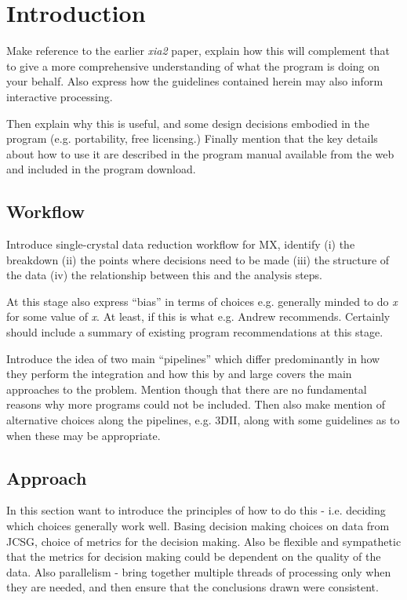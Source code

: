 \documentclass[a4paper,11pt]{article}
\begin{document}
\section{Introduction}

Make reference to the earlier \emph{xia2} paper, explain how this will
complement that to give a more comprehensive understanding of what the
program is doing on your behalf. Also express how the guidelines
contained herein may also inform interactive processing.

Then explain why this is useful, and some design decisions embodied in
the program (e.g. portability, free licensing.) Finally mention that
the key details about how to use it are described in the program
manual available from the web and included in the program download.

\subsection{Workflow}

Introduce single-crystal data reduction workflow for MX, identify (i)
the breakdown (ii) the points where decisions need to be made (iii)
the structure of the data (iv) the relationship between this and the
analysis steps. 

At this stage also express ``bias'' in terms of choices e.g. generally
minded to do \emph{x} for some value of \emph{x}. At least, if this is
what e.g. Andrew recommends. Certainly should include a summary of
existing program recommendations at this stage.

Introduce the idea of two main ``pipelines'' which differ
predominantly in how they perform the integration and how this by and
large covers the main approaches to the problem. Mention though that
there are no fundamental reasons why more programs could not be
included. Then also make mention of alternative choices along the
pipelines, e.g. 3DII, along with some guidelines as to when these may
be appropriate.

\subsection{Approach}

In this section want to introduce the principles of how to do this -
i.e. deciding which choices generally work well. Basing decision
making choices on data from JCSG, choice of metrics for the decision
making. Also be flexible and sympathetic that the metrics for decision
making could be dependent on the quality of the data. Also parallelism
- bring together multiple threads of processing only when they are
needed, and then ensure that the conclusions drawn were consistent.
\end{document}
